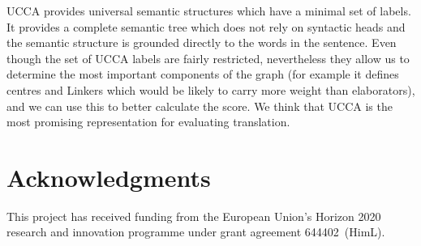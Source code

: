 \documentclass[11pt,letterpaper]{article}
\newcommand{\GrantNo}{644402}
\newcommand{\ProjectName}{HimL}
\newcommand{\ProjectType}{Horizon 2020 Innovation Action}
\begin{document}
{UCCA provides universal semantic structures which 
have
a minimal set of labels. It provides a complete semantic tree which does not rely on syntactic heads and the semantic structure is grounded directly to the words in the sentence. 
 Even though the set of UCCA labels are fairly restricted,  nevertheless they allow us to determine the most important components of the graph (for example it defines centres and Linkers which would be likely to carry more weight than elaborators), and we can use this to better calculate the score. 
We think that UCCA is the
most promising representation for evaluating translation. 
}

\section*{Acknowledgments}


This project has received funding from the European Union's Horizon 2020 research and innovation
programme under grant agreement \GrantNo\ (\ProjectName).





\end{document}
